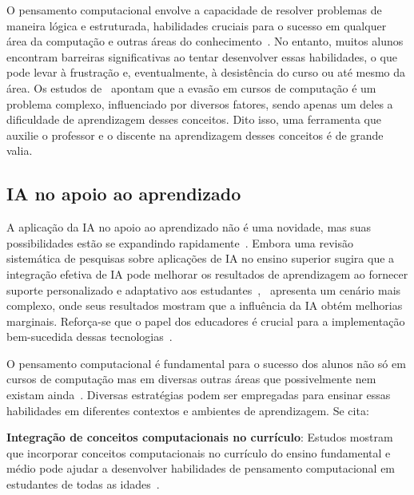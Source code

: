 \documentclass[journal]{IEEEtran}
\begin{document}
O pensamento computacional envolve a capacidade de resolver problemas de maneira lógica e estruturada, habilidades cruciais para o sucesso em qualquer área da computação e outras áreas do conhecimento~\cite{wing2008computational}.
No entanto, muitos alunos encontram barreiras significativas ao tentar desenvolver essas habilidades, o que pode levar à frustração e, eventualmente, à desistência do curso ou até mesmo da área.
Os estudos de~\cite{hoed2017analise,kinnunen2006students,watson2014failure} apontam que a evasão em cursos de computação é um problema complexo, influenciado por diversos fatores, sendo apenas um deles a dificuldade de aprendizagem desses conceitos.
Dito isso, uma ferramenta que auxilie o professor e o discente na aprendizagem desses conceitos é de grande valia.

\subsection{IA no apoio ao aprendizado}

\noindent%
A aplicação da IA no apoio ao aprendizado não é uma novidade, mas suas possibilidades estão se expandindo rapidamente~\cite{bates2020can}.
Embora uma revisão sistemática de pesquisas sobre aplicações de IA no ensino superior sugira que a integração efetiva de IA pode melhorar os resultados de aprendizagem ao fornecer suporte personalizado e adaptativo aos estudantes~\cite{zawacki2019systematic},~\cite{bates2020can} apresenta um cenário mais complexo, onde seus resultados mostram que a influência da IA obtém melhorias marginais.
Reforça-se que o papel dos educadores é crucial para a implementação bem-sucedida dessas tecnologias~\cite{oliveira_de_souza_2022,kasneci2023chatgpt,jeon2023large}.

O pensamento computacional é fundamental para o sucesso dos alunos não só em cursos de computação mas em diversas outras áreas que possivelmente nem existam ainda~\cite{wing2008computational,wef2019schools}.
Diversas estratégias podem ser empregadas para ensinar essas habilidades em diferentes contextos e ambientes de aprendizagem.
Se cita:

\noindent\textbf{Integração de conceitos computacionais no currículo}:
Estudos mostram que incorporar conceitos computacionais no currículo do ensino fundamental e médio pode ajudar a desenvolver habilidades de pensamento computacional em estudantes de todas as idades~\cite{oliveira_de_souza_2022,hong2020introduction,gomes2017desenvolvendo,de2024ensino}.
\end{document}
